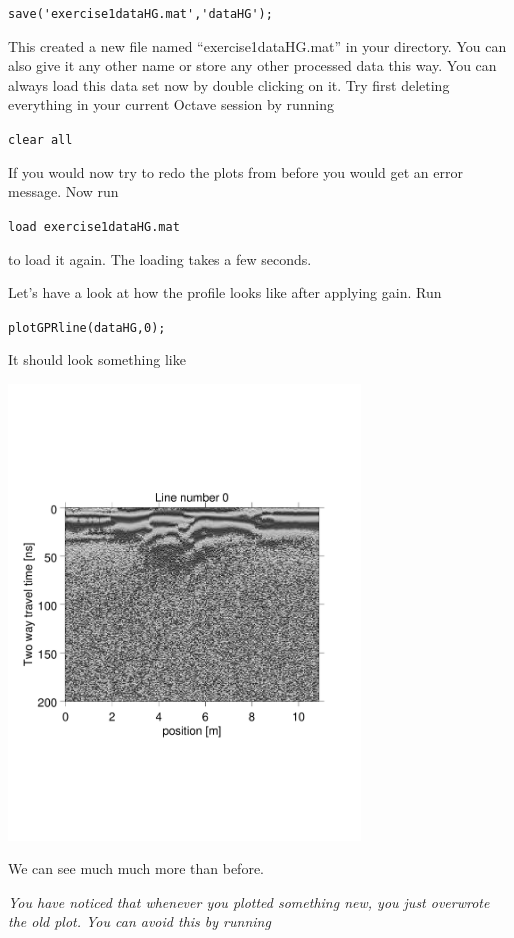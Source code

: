 \documentclass[11pt]{article}
\begin{document}
\qquad \verb#save('exercise1dataHG.mat','dataHG');#
 
This created a new file named ``exercise1dataHG.mat'' in your
directory. You can also give it any other name or store any other
processed data this way. You can always load this data set now by
double clicking on it. Try first deleting everything in your current
Octave session by running
 
\qquad \verb#clear all#
 
If you would now try to redo the plots from before you would get an
error message. Now run
 
\qquad \verb#load exercise1dataHG.mat#
 
to load it again.  The loading takes a few seconds.


Let's have a look at how the profile looks like after applying
gain. Run

\qquad \verb#plotGPRline(dataHG,0);#

It should look something like
\begin{center}
\includegraphics[width=0.7\textwidth, trim = 0.9cm 6cm 2cm
  6.5cm,clip]{figures/GPRlineHG0}
\end{center}

We can see much much more than before.

\emph{You have noticed that whenever you plotted something new, you
  just overwrote the old plot. You can avoid this by running}
\end{document}
